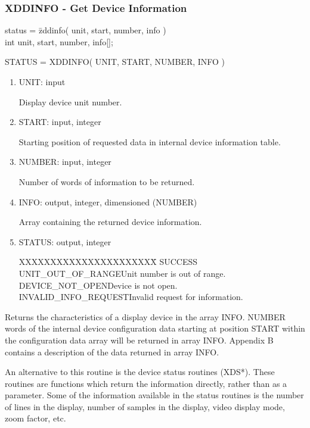 \subsubsection{XDDINFO - Get Device Information}
\begin{tabbing}
status = \=zddinfo( unit, start, number, info )\\
\>int  unit, start, number, info[];\\
\end{tabbing}
STATUS = XDDINFO( UNIT, START, NUMBER, INFO )
\begin{enumerate}
\item UNIT:  input

Display device unit number.
\item START:  input, integer

Starting position of requested data in internal device information
table.
\item NUMBER:  input, integer

Number of words of information to be returned.
\item INFO:  output, integer, dimensioned (NUMBER)

Array containing the returned device information.
\item STATUS:  output, integer
\begin{tabbing}
XXXXXXXXXXXXXXXXXXXXXX\=\kill
SUCCESS\\
UNIT\_OUT\_OF\_RANGE\>Unit number is out of range.\\
DEVICE\_NOT\_OPEN\>Device is not open.\\
INVALID\_INFO\_REQUEST\>Invalid request for information.\\
\end{tabbing}
\end{enumerate}
Returns the characteristics of a display device in the array INFO.
NUMBER words of the internal device configuration data starting at
position START within the configuration data array will be returned
in array INFO.  Appendix B contains a description of the data
returned in array INFO.

An alternative to this routine is the device status routines (XDS*).
These routines are functions which return the information directly,
rather than as a parameter.  Some of the information available in
the status routines is the number of lines in the display, number of
samples in the display, video display mode, zoom factor, etc.
\newpage
